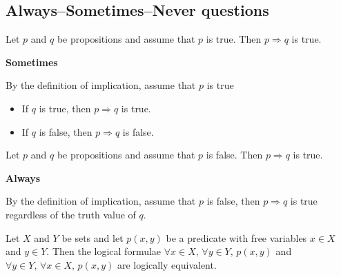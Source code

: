 \subsection*{Always--Sometimes--Never questions}


\begin{chapex} %
\label{cqLogicASNBegin}
Let $p$ and $q$ be propositions and assume that $p$ is true. Then $p \Rightarrow q$ is true.
\end{chapex}

\begin{mysolution}
    \textbf{Sometimes}

    By the definition of implication, assume that $p$ is true
    \begin{itemize}
        \item If $q$ is true, then $p \Rightarrow q$ is true.
        \item If $q$ is false, then $p \Rightarrow q$ is false. 
    \end{itemize}
\end{mysolution}

\begin{chapex} %
Let $p$ and $q$ be propositions and assume that $p$ is false. Then $p \Rightarrow q$ is true.
\end{chapex}

\begin{mysolution}
    \textbf{Always}

    By the definition of implication, assume that $p$ is false, then $p \Rightarrow q$ is true regardless of the truth value of $q$.
\end{mysolution}

\begin{chapex} %
Let $X$ and $Y$ be sets and let $p(x,y)$ be a predicate with free variables $x \in X$ and $y \in Y$. Then the logical formulae $\forall x \in X,\, \forall y \in Y,\, p(x,y)$ and $\forall y \in Y,\, \forall x \in X,\, p(x,y)$ are logically equivalent.
\end{chapex}

